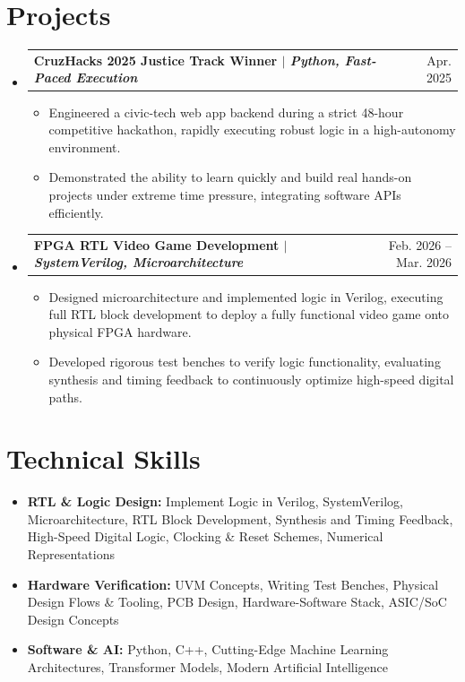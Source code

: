 \documentclass[letterpaper,11pt]{article}
\makeatletter
\newcommand{\resumeItem}[1]{\item{#1}}
\newcommand{\resumeProjectHeading}[2]{
  \item
    \begin{tabular*}{0.97\textwidth}[t]{l@{\extracolsep{\fill}}r}
      \textbf{#1} & #2 \\
    \end{tabular*}
}
\newcommand{\resumeSubHeadingListStart}{\begin{itemize}[label=\textbullet]}
\newcommand{\resumeSubHeadingListEnd}{\end{itemize}}
\newcommand{\resumeItemListStart}{\begin{itemize}[label=-]}
\newcommand{\resumeItemListEnd}{\end{itemize}}
\makeatother
\begin{document}
\section{Projects}
\resumeSubHeadingListStart
  \resumeProjectHeading{CruzHacks 2025 Justice Track Winner $\vert$ \emph{Python, Fast-Paced Execution}}{Apr. 2025}
  \resumeItemListStart
    \resumeItem{Engineered a civic-tech web app backend during a strict 48-hour competitive hackathon, rapidly executing robust logic in a high-autonomy environment.}
    \resumeItem{Demonstrated the ability to learn quickly and build real hands-on projects under extreme time pressure, integrating software APIs efficiently.}
  \resumeItemListEnd
  \resumeProjectHeading{FPGA RTL Video Game Development $\vert$ \emph{SystemVerilog, Microarchitecture}}{Feb. 2026 -- Mar. 2026}
  \resumeItemListStart
    \resumeItem{Designed microarchitecture and implemented logic in Verilog, executing full RTL block development to deploy a fully functional video game onto physical FPGA hardware.}
    \resumeItem{Developed rigorous test benches to verify logic functionality, evaluating synthesis and timing feedback to continuously optimize high-speed digital paths.}
  \resumeItemListEnd
\resumeSubHeadingListEnd

\section{Technical Skills}
\resumeSubHeadingListStart
  \item{\textbf{RTL \& Logic Design:} Implement Logic in Verilog, SystemVerilog, Microarchitecture, RTL Block Development, Synthesis and Timing Feedback, High-Speed Digital Logic, Clocking \& Reset Schemes, Numerical Representations}
  \item{\textbf{Hardware Verification:} UVM Concepts, Writing Test Benches, Physical Design Flows \& Tooling, PCB Design, Hardware-Software Stack, ASIC/SoC Design Concepts}
  \item{\textbf{Software \& AI:} Python, C++, Cutting-Edge Machine Learning Architectures, Transformer Models, Modern Artificial Intelligence}
\resumeSubHeadingListEnd
\end{document}
